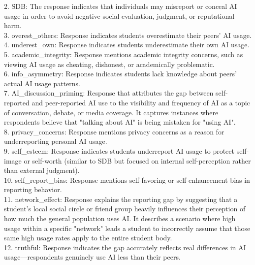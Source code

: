 \documentclass[11pt]{article}
\begin{document}
\begin{sloppypar}
\begin{appendices}
\begin{tcolorbox}
2. SDB: The response indicates that individuals may misreport or conceal AI usage in order to avoid negative social evaluation, judgment, or reputational harm.\\

3. overest\_others: Response indicates students overestimate their peers' AI usage.\\

4. underest\_own: Response indicates students underestimate their own AI usage.\\

5. academic\_integrity: Response mentions academic integrity concerns, such as viewing AI usage as cheating, dishonest, or academically problematic.\\

6. info\_asymmetry: Response indicates students lack knowledge about peers' actual AI usage patterns.\\

7. AI\_discussion\_priming: Response that attributes the gap between self-reported and peer-reported AI use to the visibility and frequency of AI as a topic of conversation, debate, or media coverage. It captures instances where respondents believe that "talking about AI" is being mistaken for "using AI".\\

8. privacy\_concerns: Response mentions privacy concerns as a reason for underreporting personal AI usage.\\

9. self\_esteem: Response indicates students underreport AI usage to protect self-image or self-worth (similar to SDB but focused on internal self-perception rather than external judgment).\\

10. self\_report\_bias: Response mentions self-favoring or self-enhancement bias in reporting behavior.\\

11. network\_effect: Response explains the reporting gap by suggesting that a student’s local social circle or friend group heavily influences their perception of how much the general population uses AI. It describes a scenario where high usage within a specific "network" leads a student to incorrectly assume that those same high usage rates apply to the entire student body.\\

12. truthful: Response indicates the gap accurately reflects real differences in AI usage—respondents genuinely use AI less than their peers.\\



\end{tcolorbox}
\end{appendices}
\end{sloppypar}
\end{document}
